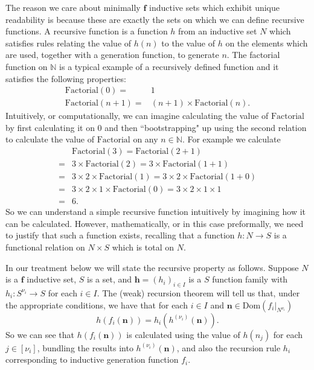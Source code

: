 \documentclass[oneside, 12pt]{book}
\theoremstyle{break}
\newtheorem{preformal definition}[definition]{Preformal Definition}
\newtheorem{preformal theorem}[theorem]{Preformal Theorem}
\newcommand{\bv}[1]{\boldsymbol{#1}}
\newcommand{\qq}[1]{``#1"}
\newcommand{\N}[0]{\mathbb{N}}
\begin{document}
			The reason we care about minimally $\bv{f}$ inductive sets which exhibit unique readability is because these are exactly the sets on which we can define recursive functions.
			A recursive function is a function $h$ from an inductive set $N$ which satisfies rules relating the value of $h(n)$ to the value of $h$ on the elements which are used, together with a generation function, to generate $n$.
			The factorial function on $\N$ is a typical example of a recursively defined function and it satisfies the following properties:
			\begin{align*}
				\text{Factorial}(0) =& 1\\
				\text{Factorial}(n+1) =& (n+1) \times \text{Factorial}(n).
			\end{align*}
			Intuitively, or computationally, we can imagine calculating the value of $\text{Factorial}$ by first calculating it on 0 and then \qq{bootstrapping} up using the second relation to calculate the value of $\text{Factorial}$ on any $n\in \N$.
			For example we calculate 
			\begin{align*}
				&\text{Factorial}(3) = \text{Factorial}(2+1)\\
				=& 3\times\text{Factorial}(2) = 3\times \text{Factorial}(1+1)\\
				=& 3\times 2 \times \text{Factorial}(1) = 3\times 2 \times \text{Factorial}(1 + 0)\\
				=& 3\times 2 \times 1 \times \text{Factorial}(0) = 3 \times 2 \times 1 \times 1\\
				=& 6.
			\end{align*}
			So we can understand a simple recursive function intuitively by imagining how it can be calculated.
			However, mathematically, or in this case preformally, we need to justify that such a function exists, recalling that a function $h:N \to S$ is a functional relation on $N\times S$ which is total on $N$.
			
			In our treatment below we will state the recursive property as follows.
			Suppose $N$ is a $\bv{f}$ inductive set, $S$ is a set, and $\bv{h} = (h_i)_{i\in I}$ is a $S$ function family with $h_i:S^{\nu_i} \to S$ for each $i\in I$.
			The (weak) recursion theorem will tell us that, under the appropriate conditions, we have that for each $i\in I$ and $\bv{n} \in \text{Dom}(f_i|_{N^{\nu_i}})$
			\begin{equation*}
				h(f_i(\bv{n})) = h_i(h^{(\nu_i)}(\bv{n})).
			\end{equation*}
			So we can see that $h(f_i(\bv{n}))$ is calculated using the value of $h(n_j)$ for each $j\in [\nu_i]$, bundling the results into $h^{(\nu_i)}(\bv{n})$, and also the recursion rule $h_i$ corresponding to inductive generation function $f_i$.
			
\end{document}
